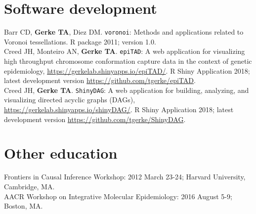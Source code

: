 \documentclass[11pt, a4paper]{article} %
\begin{document}
\section*{Software development}
Barr CD, {\bf Gerke TA}, Diez DM. \verb|voronoi|: Methods and applications related to Voronoi tessellations. R package 2011; version 1.0.\\

Creed JH, Monteiro AN, {\bf Gerke TA}. \verb|epiTAD|: A web application for visualizing high throughput chromosome conformation capture data in the context of genetic epidemiology, \href{https://gerkelab.shinyapps.io/epiTAD/}{https://gerkelab.shinyapps.io/epiTAD/}. R Shiny Application 2018; latest development version \href{https://github.com/tgerke/epiTAD}{https://github.com/tgerke/epiTAD}.\\

Creed JH, {\bf Gerke TA}. \verb|ShinyDAG|: A web application for building, analyzing, and visualizing directed acyclic graphs (DAGs), \href{https://gerkelab.shinyapps.io/shinyDAG/}{https://gerkelab.shinyapps.io/shinyDAG/}. R Shiny Application 2018; latest development version \href{https://github.com/tgerke/ShinyDAG}{https://github.com/tgerke/ShinyDAG}.

\section*{Other education}
Frontiers in Causal Inference Workshop: 2012 March 23-24; Harvard University, Cambridge, MA.\\

AACR Workshop on Integrative Molecular Epidemiology: 2016 August 5-9; Boston, MA.\\


\end{document}
